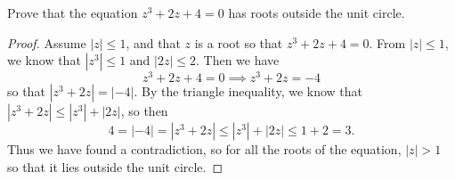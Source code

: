 \documentclass[12pt]{article}
\newenvironment{statement}[2][Statement]{\begin{trivlist}
\item[\hskip \labelsep {\bfseries #1}\hskip \labelsep {\bfseries #2.}]}{\end{trivlist}}
\begin{document}
\begin{statement}[Problem]{3}
  Prove that the equation $z^3 + 2z+4=0$ has roots outside the unit circle. 
\end{statement}
\begin{proof}
  Assume $|z| \leq 1$, and that $z$ is a root so that $z^3 + 2z + 4=0$. 
  From $|z| \leq 1$, we know that $|z^3| \leq 1$ and $|2z| \leq 2$. Then we have 
  \begin{equation*}
    z^3 +2z+4=0 \implies z^3+2z=-4
  \end{equation*}
  so that $|z^3+2z|=|-4|$.
  By the triangle inequality, we know that $|z^3 + 2z| \leq |z^3|+|2z|$, so then 
  \begin{equation*}
    4=|-4|=|z^3+2z| \leq |z^3| +|2z| \leq 1 + 2 = 3.
  \end{equation*}
  Thus we have found a contradiction, so for all the roots of the equation, $|z| > 1$ so that it lies outside the unit circle. 
\end{proof}
\end{document}
